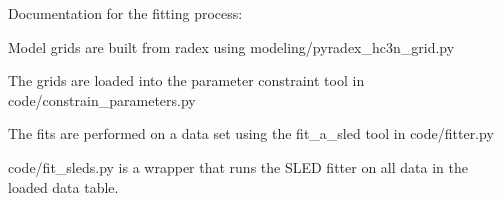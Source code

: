 Documentation for the fitting process:

Model grids are built from radex using modeling/pyradex_hc3n_grid.py

The grids are loaded into the parameter constraint tool in code/constrain_parameters.py

The fits are performed on a data set using the fit_a_sled tool in code/fitter.py

code/fit_sleds.py is a wrapper that runs the SLED fitter on all data in the loaded data table.